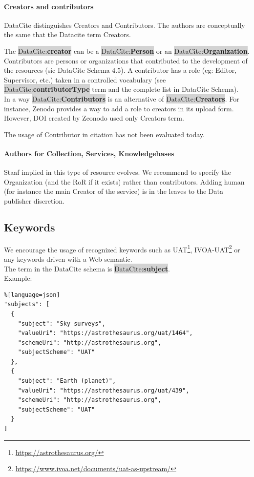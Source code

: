 \documentclass[11pt,a4paper]{ivoa}
\newcommand{\dataciteterm}[1]{\colorbox{lightgray}{DataCite:\textbf{#1}}}
\begin{document}
\paragraph{Creators and contributors}
DataCite distinguishes Creators and Contributors. The authors are conceptually the same that the Datacite term Creators.

The \dataciteterm{creator} can be a \dataciteterm{Person} or an \dataciteterm{Organization}.
Contributors are persons or organizations that contributed to the development of the resources (sic DataCite Schema 4.5).
A contributor has a role (eg: Editor, Supervisor, etc.) taken in a controlled vocabulary (see \dataciteterm{contributorType} term and the complete list in DataCite Schema).\\

In a way \dataciteterm{Contributors} is an alternative of \dataciteterm{Creators}. For instance, Zenodo provides a way to add a role to creators in its upload form. However, DOI created by Zeonodo used only Creators term.

The usage of Contributor in citation has not been evaluated today.


\paragraph{Authors for Collection, Services, Knowledgebases}
Staaf implied in this type of resource evolves. We recommend to specify the Organization (and the RoR if it exists) rather than contributors. Adding human (for instance the main Creator of the service) is in the leaves to the Data publisher discretion.

\subsection{Keywords}
\label{sec:keywords}
We encourage the usage of recognized keywords such as UAT\footnote{\url{https://astrothesaurus.org/}}, IVOA-UAT\footnote{\url{https://www.ivoa.net/documents/uat-as-upstream/}} or any keywords driven with a Web semantic.\\

The term in the DataCite schema is \dataciteterm{subject}.\\

Example:\\
\begin{lstlisting}%[language=json]
"subjects": [
  {
    "subject": "Sky surveys",
    "valueUri": "https://astrothesaurus.org/uat/1464",
    "schemeUri": "http://astrothesaurus.org",
    "subjectScheme": "UAT"
  },
  {
    "subject": "Earth (planet)",
    "valueUri": "https://astrothesaurus.org/uat/439",
    "schemeUri": "http://astrothesaurus.org",
    "subjectScheme": "UAT"
  }
]

\end{lstlisting}
\end{document}
